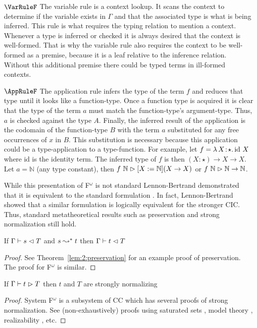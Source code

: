 $\VarRuleF$ The variable rule is a context lookup.
It scans the context to determine if the variable exists in $\Gamma$ and that the associated type is what is being inferred.
This rule is what requires the typing relation to mention a context.
Whenever a type is inferred or checked it is always desired that the context is well-formed.
That is why the variable rule also requires the context to be well-formed as a premise, because it is a leaf relative to the inference relation.
Without this additional premise there could be typed terms in ill-formed contexts.

$\AppRuleF$ The application rule infers the type of the term $f$ and reduces that type until it looks like a function-type.
Once a function type is acquired it is clear that the type of the term $a$ must match the function-type's argument-type.
Thus, $a$ is checked against the type $A$.
Finally, the inferred result of the application is the codomain of the function-type $B$ with the term $a$ substituted for any free occurrences of $x$ in $B$.
This substitution is necessary because this application could be a type-application to a type-function.
For example, let $f = {\lambda}\, X\! : \! \star.\, \text{id}\ X$ where id is the identity term.
The inferred type of $f$ is then $(X : \star) \to X \to X$.
Let $a = \mathbb{N}$ (any type constant), then $f\ \mathbb{N} \vartriangleright [X := \mathbb{N}](X \to X)$ or $f\ \mathbb{N} \infr \mathbb{N} \to \mathbb{N}$.

While this presentation of F$^\omega$ is not standard Lennon-Bertrand demonstrated that it is equivalent to the standard formulation \cite{lennon2021}.
In fact, Lennon-Bertrand showed that a similar formulation is logically equivalent for the stronger CIC.
Thus, standard metatheoretical results such as preservation and strong normalization still hold.

\begin{lemma}
    If $\Gamma \vdash s \vartriangleleft T$ and $s \leadsto^* t$ then $\Gamma \vdash t \vartriangleleft T$
\end{lemma}
\begin{proof}
    See Theorem~\ref{lem:2:preservation} for an example proof of preservation.
    The proof for F$^\omega$ is similar.
\end{proof}

\begin{theorem}
    If $\Gamma \vdash t \vartriangleright T$ then $t$ and $T$ are strongly normalizing
\end{theorem}
\begin{proof}
    System F$^\omega$ is a subsystem of CC which has several proofs of strong normalization.
    See (non-exhaustively) proofs using saturated sets \cite{geuvers1994_sn_satset}, model theory \cite{terlouw1995_sn}, realizability \cite{ong1993}, etc.
\end{proof}

